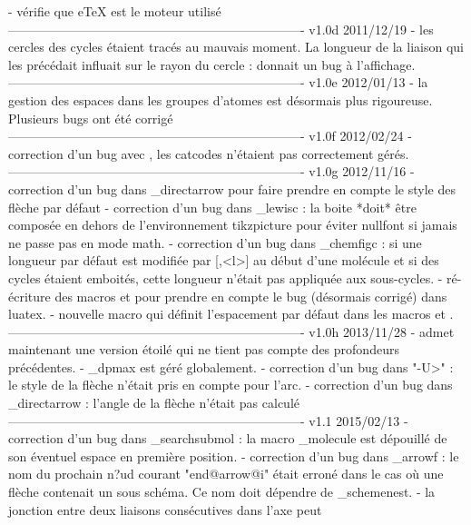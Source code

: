     - vérifie que eTeX est le moteur utilisé
----------------------------------------------------------------------
v1.0d      2011/12/19
    - les cercles des cycles étaient tracés au mauvais moment. La
      longueur de la liaison qui les précédait influait sur le
      rayon du cercle :  donnait un bug
      à l'affichage.
----------------------------------------------------------------------
v1.0e      2012/01/13
    - la gestion des espaces dans les groupes d'atomes est
      désormais plus rigoureuse. Plusieurs bugs ont été
      corrigé
----------------------------------------------------------------------
v1.0f      2012/02/24
    - correction d'un bug avec , les catcodes n'étaient
      pas correctement gérés.
----------------------------------------------------------------------
v1.0g      2012/11/16
    - correction d'un bug dans \CF_directarrow pour faire prendre en
      compte le style des flèche par défaut
    - correction d'un bug dans \CF_lewisc : la boite *doit* être
      composée en dehors de l'environnement tikzpicture pour
      éviter nullfont si jamais \printatom ne passe pas en mode
      math.
    - correction d'un bug dans \CF_chemfigc : si une longueur par
      défaut est modifiée par [,<l>] au début d'une molécule
      et si des cycles étaient emboités, cette longueur n'était
      pas appliquée aux sous-cycles.
    - ré-écriture des macros \chemabove et \chembemow pour
      prendre en compte le bug (désormais corrigé) dans luatex.
    - nouvelle macro \setstacksep qui définit l'espacement par
      défaut dans les macros \chemabove et \chembelow.
----------------------------------------------------------------------
v1.0h      2013/11/28
    - \chemname admet maintenant une version étoilé qui ne tient
      pas compte des profondeurs précédentes.
    - \CF_dpmax est géré globalement.
    - correction d'un bug dans "-U>" : le style de la flèche
      n'était pris en compte pour l'arc.
    - correction d'un bug dans \CF_directarrow : l'angle de la
      flèche n'était pas calculé
----------------------------------------------------------------------
v1.1       2015/02/13
    - correction d'un bug dans \CF_searchsubmol : la macro
      \CF_molecule est dépouillé de son éventuel espace
      en première position.
    - correction d'un bug dans \CF_arrowf : le nom du prochain
      n?ud courant "end@arrow@i" était erroné dans le cas où une
      flèche contenait un sous schéma. Ce nom doit dépendre de
      \CF_schemenest.
    - la jonction entre deux liaisons consécutives dans l'axe peut
